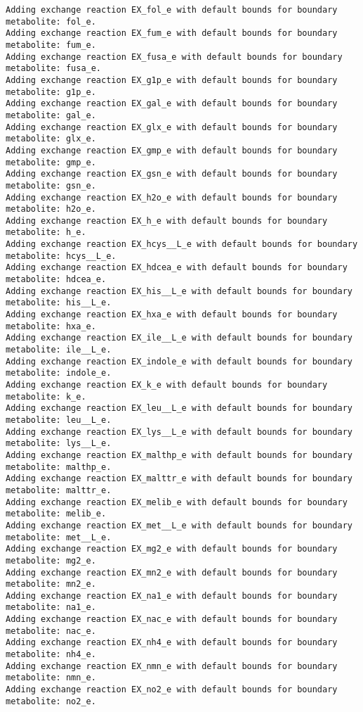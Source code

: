 \documentclass[
  letterpaper,
  DIV=11,
  numbers=noendperiod]{scrartcl}
\begin{document}
\begin{verbatim}
Adding exchange reaction EX_fol_e with default bounds for boundary metabolite: fol_e.
Adding exchange reaction EX_fum_e with default bounds for boundary metabolite: fum_e.
Adding exchange reaction EX_fusa_e with default bounds for boundary metabolite: fusa_e.
Adding exchange reaction EX_g1p_e with default bounds for boundary metabolite: g1p_e.
Adding exchange reaction EX_gal_e with default bounds for boundary metabolite: gal_e.
Adding exchange reaction EX_glx_e with default bounds for boundary metabolite: glx_e.
Adding exchange reaction EX_gmp_e with default bounds for boundary metabolite: gmp_e.
Adding exchange reaction EX_gsn_e with default bounds for boundary metabolite: gsn_e.
Adding exchange reaction EX_h2o_e with default bounds for boundary metabolite: h2o_e.
Adding exchange reaction EX_h_e with default bounds for boundary metabolite: h_e.
Adding exchange reaction EX_hcys__L_e with default bounds for boundary metabolite: hcys__L_e.
Adding exchange reaction EX_hdcea_e with default bounds for boundary metabolite: hdcea_e.
Adding exchange reaction EX_his__L_e with default bounds for boundary metabolite: his__L_e.
Adding exchange reaction EX_hxa_e with default bounds for boundary metabolite: hxa_e.
Adding exchange reaction EX_ile__L_e with default bounds for boundary metabolite: ile__L_e.
Adding exchange reaction EX_indole_e with default bounds for boundary metabolite: indole_e.
Adding exchange reaction EX_k_e with default bounds for boundary metabolite: k_e.
Adding exchange reaction EX_leu__L_e with default bounds for boundary metabolite: leu__L_e.
Adding exchange reaction EX_lys__L_e with default bounds for boundary metabolite: lys__L_e.
Adding exchange reaction EX_malthp_e with default bounds for boundary metabolite: malthp_e.
Adding exchange reaction EX_malttr_e with default bounds for boundary metabolite: malttr_e.
Adding exchange reaction EX_melib_e with default bounds for boundary metabolite: melib_e.
Adding exchange reaction EX_met__L_e with default bounds for boundary metabolite: met__L_e.
Adding exchange reaction EX_mg2_e with default bounds for boundary metabolite: mg2_e.
Adding exchange reaction EX_mn2_e with default bounds for boundary metabolite: mn2_e.
Adding exchange reaction EX_na1_e with default bounds for boundary metabolite: na1_e.
Adding exchange reaction EX_nac_e with default bounds for boundary metabolite: nac_e.
Adding exchange reaction EX_nh4_e with default bounds for boundary metabolite: nh4_e.
Adding exchange reaction EX_nmn_e with default bounds for boundary metabolite: nmn_e.
Adding exchange reaction EX_no2_e with default bounds for boundary metabolite: no2_e.

\end{verbatim}
\end{document}

